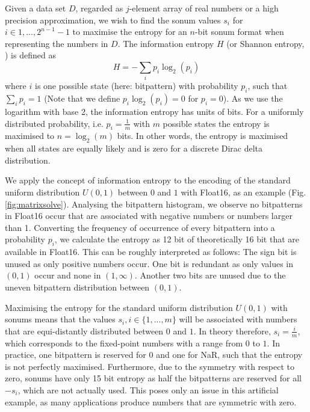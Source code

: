 Given a data set $D$, regarded as $j$-element array of real numbers or a high precision approximation, we wish to find the sonum values $s_i$ for $i \in {1,...,2^{n-1}-1}$ to maximise the entropy for an $n$-bit sonum format when representing the numbers in $D$. The information entropy $H$ (or Shannon entropy, \cite{MacKay2003a}) is defined as
\begin{equation}
     H = -\sum_i p_i \log_2(p_i)
     \label{eq:entropy}
\end{equation}
where $i$ is one possible state (here: bitpattern) with probability $p_i$, such that $\sum_ip_i = 1$ (Note that we define $p_i \log_2(p_i) = 0$ for $p_i = 0$). As we use the logarithm with base 2, the information entropy has units of bits. For a uniformly distributed probability, i.e. $p_i = \tfrac{1}{m}$ with $m$ possible states the entropy is maximised to $n = \log_2(m)$ bits. In other words, the entropy is maximised when all states are equally likely and is zero for a discrete Dirac delta distribution.

We apply the concept of information entropy to the encoding of the standard uniform distribution $U(0,1)$ between $0$ and $1$ with Float16, as an example (Fig. \ref{fig:matrixsolve}). Analysing the bitpattern histogram, we observe no bitpatterns in Float16 occur that are associated with negative numbers or numbers larger than 1. Converting the frequency of occurrence of every bitpattern into a probability $p_i$, we calculate the entropy as 12 bit of theoretically 16 bit that are available in Float16. This can be roughly interpreted as follows: The sign bit is unused as only positive numbers occur. One bit is redundant as only values in $(0,1)$ occur and none in $(1,\infty)$. Another two bits are unused due to the uneven bitpattern distribution between $(0,1)$.

Maximising the entropy for the standard uniform distribution $U(0,1)$ with sonums means that the values $s_i, i \in \{1,...,m\}$ will be associated with numbers that are equi-distantly distributed between $0$ and $1$. In theory therefore, $s_i = \tfrac{i}{m}$, which corresponds to the fixed-point numbers with a range from $0$ to $1$. In practice, one bitpattern is reserved for $0$ and one for NaR, such that the entropy is not perfectly maximised. Furthermore, due to the symmetry with respect to zero, sonums have only 15 bit entropy as half the bitpatterns are reserved for all $-s_i$, which are not actually used. This poses only an issue in this artificial example, as many applications produce numbers that are symmetric with zero.

